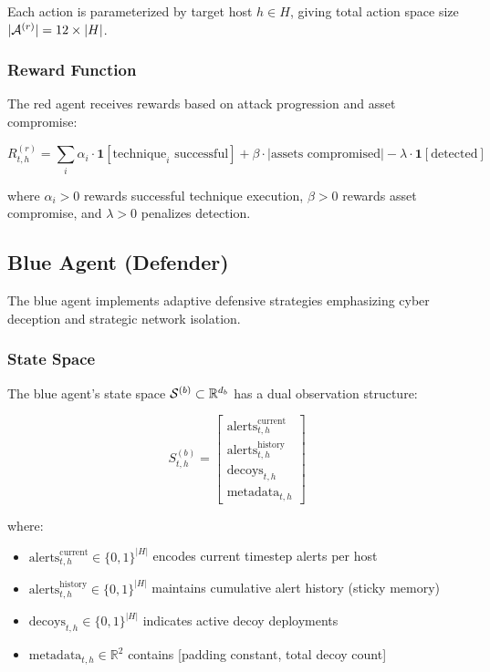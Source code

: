\documentclass[11pt]{article}
\theoremstyle{definition}
\theoremstyle{plain}
\begin{document}
Each action is parameterized by target host $h \in H$, giving total action space size $|\mathcal{A}^{(r)}| = 12 \times |H|$.

\subsubsection{Reward Function}
The red agent receives rewards based on attack progression and asset compromise:

\begin{equation}
R_{t,h}^{(r)} = \sum_{i} \alpha_i \cdot \mathbf{1}[\text{technique}_i \text{ successful}] + \beta \cdot |\text{assets compromised}| - \lambda \cdot \mathbf{1}[\text{detected}]
\end{equation}

where $\alpha_i > 0$ rewards successful technique execution, $\beta > 0$ rewards asset compromise, and $\lambda > 0$ penalizes detection.

\subsection{Blue Agent (Defender)}

The blue agent implements adaptive defensive strategies emphasizing cyber deception and strategic network isolation.

\subsubsection{State Space}
The blue agent's state space $\mathcal{S}^{(b)} \subset \mathbb{R}^{d_b}$ has a dual observation structure:

\begin{equation}
S_{t,h}^{(b)} = \begin{bmatrix}
\text{alerts}_{t,h}^{\text{current}} \\
\text{alerts}_{t,h}^{\text{history}} \\
\text{decoys}_{t,h} \\
\text{metadata}_{t,h}
\end{bmatrix}
\end{equation}

where:
\begin{itemize}
    \item $\text{alerts}_{t,h}^{\text{current}} \in \{0,1\}^{|H|}$ encodes current timestep alerts per host
    \item $\text{alerts}_{t,h}^{\text{history}} \in \{0,1\}^{|H|}$ maintains cumulative alert history (sticky memory)
    \item $\text{decoys}_{t,h} \in \{0,1\}^{|H|}$ indicates active decoy deployments
    \item $\text{metadata}_{t,h} \in \mathbb{R}^2$ contains [padding constant, total decoy count]
\end{itemize}
\end{document}
